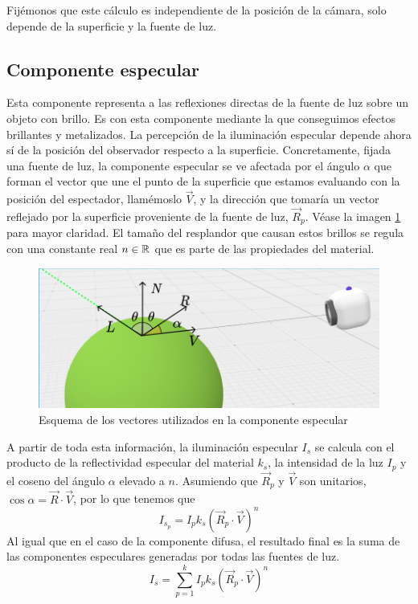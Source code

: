 Fijémonos que este cálculo es independiente de la posición de la cámara, solo depende de la superficie y la fuente de luz.

\subsection{Componente especular}

Esta componente representa a las reflexiones directas de la fuente de luz sobre un objeto con brillo. Es con esta componente mediante la que conseguimos efectos brillantes y metalizados. La percepción de la iluminación especular depende ahora sí de la posición del observador respecto a la superficie. Concretamente, fijada una fuente de luz, la componente especular se ve afectada por el ángulo $\alpha$ que forman el vector que une el punto de la superficie que estamos evaluando con la posición del espectador, llamémoslo  $\vec V$, y la dirección que tomaría un vector reflejado por la superficie proveniente de la fuente de luz, $\vec R_p$. Véase la imagen \ref{fig:especular} para mayor claridad. El tamaño del resplandor que causan estos brillos se regula con una constante real $n\in\mathbb{R}$ que es parte de las propiedades del material.

\begin{figure} [ht]
    \centering
    \includegraphics[scale = 0.3]{img/C7/especular.png}
    \caption{Esquema de los vectores utilizados en la componente especular}
    \label{fig:especular}
\end{figure}

A partir de toda esta información, la iluminación especular $I_s$ se calcula con el producto de la reflectividad especular del material $k_s$, la intensidad de la luz $I_p$ y el coseno del ángulo $\alpha$ elevado a $n$. Asumiendo que $\vec R_p$ y $\vec V$ son unitarios, $\cos\alpha=\vec R\cdot \vec V$, por lo que tenemos que
\begin{equation}
    I_{s_p} = I_p k_s (\vec R_p\cdot \vec V)^n
\end{equation}   
Al igual que en el caso de la componente difusa, el resultado final es la suma de las componentes especulares generadas por todas las fuentes de luz.
\begin{equation}
    I_s = \sum_{p=1}^k I_p k_s (\vec R_p \cdot \vec V)^n
\end{equation}

